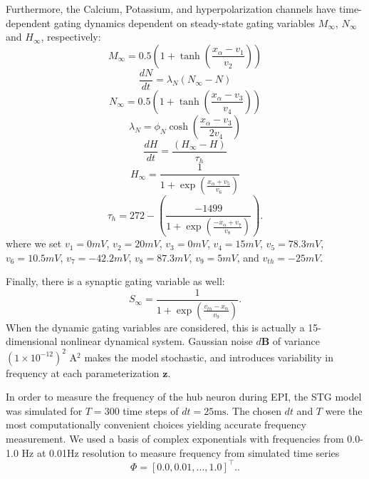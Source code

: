 \documentclass[11pt]{article}
\begin{document}
Furthermore, the Calcium, Potassium, and hyperpolarization channels have time-dependent gating dynamics dependent on steady-state gating variables $M_\infty$, $N_\infty$ and $H_\infty$, respectively:
\begin{equation}  M_{\infty} = 0.5 \left( 1 + \tanh \left( \frac{x_\alpha - v_1}{v_2} \right) \right) \end{equation}
\begin{equation}  \frac{dN}{dt} = \lambda_N (N_\infty - N)  \end{equation}
\begin{equation}  N_\infty = 0.5 \left( 1 + \tanh \left( \frac{x_\alpha - v_3}{v_4} \right) \right) \end{equation}
\begin{equation}  \lambda_N = \phi_N \cosh \left( \frac{x_\alpha - v_3}{2 v_4} \right) \end{equation}
\begin{equation}  \frac{dH}{dt} = \frac{\left( H_\infty - H \right)}{\tau_h} \end{equation}
\begin{equation}  H_\infty = \frac{1}{1 + \exp \left( \frac{x_\alpha + v_5}{v_6} \right)} \end{equation}
\begin{equation}  \tau_h = 272 - \left( \frac{-1499}{1 + \exp \left( \frac{-x_\alpha + v_7}{v_8} \right)} \right).
 \end{equation}
where we set $v_1 = 0mV$, $v_2  = 20mV$, $v_3 = 0mV$, $v_4 = 15mV$, $v_5 = 78.3mV$,
$v_6 = 10.5mV$, $v_7 = -42.2mV$, $v_8 = 87.3mV$, $v_9 = 5mV$, and $v_{th} = -25mV$.  

Finally, there is a synaptic gating variable as well:
\begin{equation} S_\infty = \frac{1}{1 + \exp \left( \frac{v_{th} - x_\alpha}{v_9} \right)} .
\end{equation}
When the dynamic gating variables are considered, this is actually a 15-dimensional nonlinear dynamical system.  Gaussian noise $d\mathbf{B}$ of variance $(1 \times 10^{-12})^2$ A$^2$ makes the model stochastic, and introduces variability in frequency at each parameterization $\mathbf{z}$.

In order to measure the frequency of the hub neuron during EPI, the STG model was simulated for $T = 300$ time steps of $dt = 25\text{ms}$.  
The chosen $dt$ and $T$ were the most computationally convenient choices yielding accurate frequency measurement.  
We used a basis of complex exponentials with frequencies from 0.0-1.0 Hz at 0.01Hz resolution to measure frequency from simulated time series
\begin{equation}
\Phi = \left[ 0.0, 0.01, ..., 1.0 \right]^\top..
\end{equation}
\end{document}
